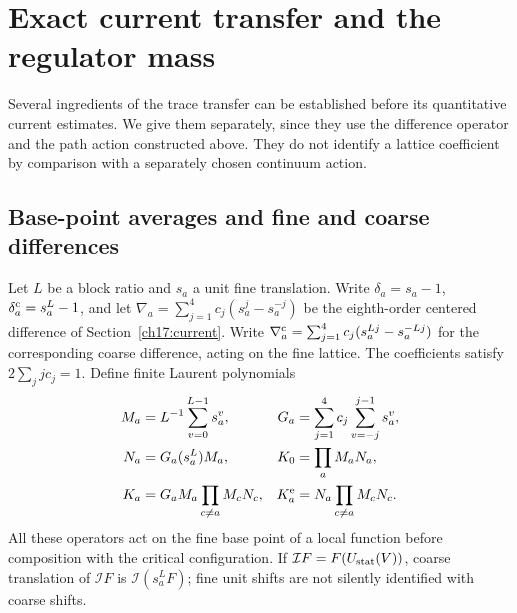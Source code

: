 \section{Exact current transfer and the regulator mass}
\label{ch17:current-suppliers}

Several ingredients of the trace transfer can be established before its
quantitative current estimates. We give them separately, since they use
the difference operator and the path action constructed above. They do not
identify a lattice coefficient by comparison with a separately chosen
continuum action.

\subsection{Base-point averages and fine and coarse differences}

Let $L$ be a block ratio and $s_a$ a unit fine translation. Write
$\delta_a=s_a-1$, $\delta_a^{\rm c}=s_a^L-1$, and let
$\nabla_a=\sum_{j=1}^4c_j(s_a^j-s_a^{-j})$ be the eighth-order
centered difference of Section~\ref{ch17:current}. Write
$\nabla_a^{\rm c}=\sum_{j=1}^4c_j(s_a^{Lj}-s_a^{-Lj})$ for the
corresponding coarse difference, acting on the fine lattice.
The coefficients satisfy
$2\sum_jjc_j=1$. Define finite Laurent polynomials
\begin{align*}
 M_a&=L^{-1}\sum_{v=0}^{L-1}s_a^v,&
 G_a&=\sum_{j=1}^4c_j\sum_{v=-j}^{j-1}s_a^v,\\
 N_a&=G_a(s_a^L)M_a,&
 K_0&=\prod_aM_aN_a,\\
 K_a&=G_aM_a\prod_{c\ne a}M_cN_c,&
 K_a^{\rm e}&=N_a\prod_{c\ne a}M_cN_c.
\end{align*}
All these operators act on the fine base point of a local function before
composition with the critical configuration. If $\mathcal I F=F(U_{\rm stat}(V))$, coarse
translation of $\mathcal IF$ is $\mathcal I(s_a^LF)$; fine unit shifts
are not silently identified with coarse shifts.

